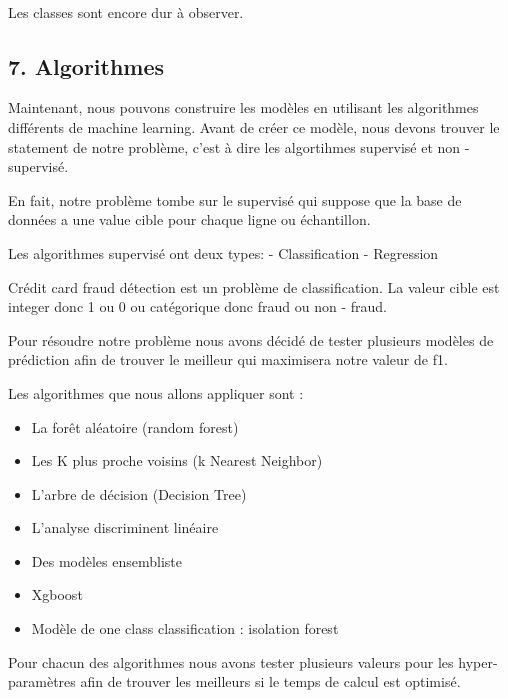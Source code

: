 \documentclass[11pt]{article}
\providecommand{\tightlist}{%
      \setlength{\itemsep}{0pt}\setlength{\parskip}{0pt}}
\begin{document}
    \begin{center}
    \end{center}
    { \hspace*{\fill} \\}
    
    Les classes sont encore dur à observer.

    \hypertarget{algorithmes}{%
\subsection{7. Algorithmes}\label{algorithmes}}

Maintenant, nous pouvons construire les modèles en utilisant les
algorithmes différents de machine learning. Avant de créer ce modèle,
nous devons trouver le statement de notre problème, c'est à dire les
algortihmes supervisé et non - supervisé.

En fait, notre problème tombe sur le supervisé qui suppose que la base
de données a une value cible pour chaque ligne ou échantillon.

Les algorithmes supervisé ont deux types: - Classification - Regression

Crédit card fraud détection est un problème de classification. La valeur
cible est integer donc 1 ou 0 ou catégorique donc fraud ou non - fraud.

Pour résoudre notre problème nous avons décidé de tester plusieurs
modèles de prédiction afin de trouver le meilleur qui maximisera notre
valeur de f1.

Les algorithmes que nous allons appliquer sont :

\begin{itemize}
\tightlist
\item
  La forêt aléatoire (random forest)
\item
  Les K plus proche voisins (k Nearest Neighbor)
\item
  L'arbre de décision (Decision Tree)
\item
  L'analyse discriminent linéaire
\item
  Des modèles ensembliste
\item
  Xgboost
\item
  Modèle de one class classification : isolation forest
\end{itemize}

Pour chacun des algorithmes nous avons tester plusieurs valeurs pour les
hyper-paramètres afin de trouver les meilleurs si le temps de calcul est
optimisé.
\end{document}
